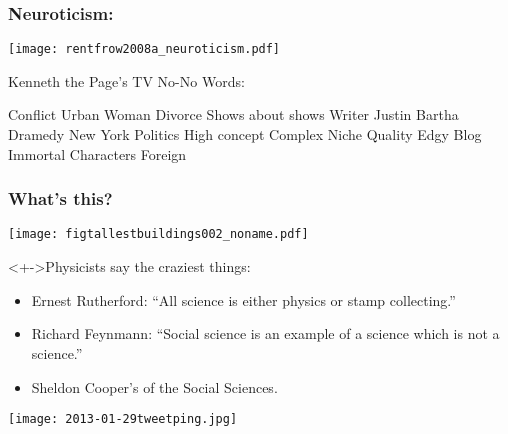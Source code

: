 \begin{frame}
  \frametitle{Neuroticism:}

  \texttt{[image: rentfrow2008a\_neuroticism.pdf]}

\end{frame}


\begin{frame}
  
Kenneth the Page's TV No-No Words:

Conflict
Urban
Woman
Divorce
Shows about shows
Writer
Justin Bartha
Dramedy
New York
Politics
High concept
Complex
Niche
Quality
Edgy
Blog
Immortal Characters
Foreign

\end{frame}



\begin{frame}
  \frametitle{What's this?}
  
  \texttt{[image: figtallestbuildings002\_noname.pdf]}

\end{frame}



\begin{frame}

  \begin{block}<+->{Physicists say the craziest things:}
    \begin{itemize}
    \item<+->
      Ernest Rutherford:
      ``All science is either physics or stamp collecting.''
    \item<+->
      Richard Feynmann:
      ``Social science is an example of a science which is not a science.''
    \item<+->
      Sheldon Cooper's 
      of the Social Sciences.
    \end{itemize}

  \end{block}


\end{frame}

\begin{frame}

  \begin{block}{}
    \texttt{[image: 2013-01-29tweetping.jpg]}
  \end{block}

\end{frame}

